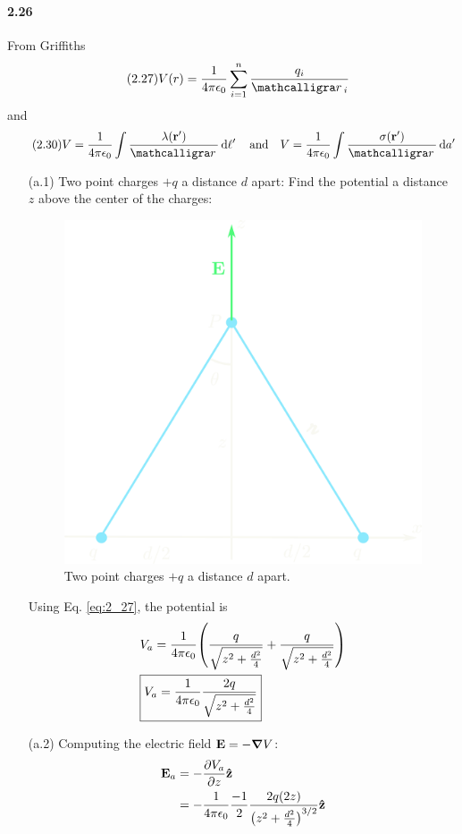 \documentclass[../main.tex]{subfiles}
\begin{document}
\newpage 
\paragraph{2.26} \label{prob:2_25}
From Griffiths %
\begin{align*} \tag{2.27} \label{eq:2_27}
    V(r) &= \ke \sum_{i = 1}^n \frac{q_i}{\scriptr_i}
\end{align*}
and
\begin{align*} \tag{2.30} \label{eq:2_30}
    V = \ke \int \frac{\lambda(\vb r')}{\scriptr} \dd{\ell'} \qand V = \ke \int \frac{\sigma(\vb r')}{\scriptr} \dd{a'} 
\end{align*}
\begin{enumerate}
    \item [(a.1)] Two point charges $+q$ a distance $d$ apart: Find the potential a distance $z$ above the center of the charges:
    \begin{figure}[ht]
        \centering
        \includegraphics[width=0.5\linewidth]{images/hw2_25a.png}
        \captionsetup{width=0.8\linewidth}
        \caption{Two point charges $+q$ a distance $d$ apart.}
        \label{fig:2_25a}
    \end{figure}
    Using Eq. \eqref{eq:2_27}, the potential is
    \begin{align*}
        &V_a = \ke \qt(\frac{q}{\sqrt{z^2 + \frac{d^2}{4}}} + \frac{q}{\sqrt{z^2 + \frac{d^2}{4}}}) \\
        &\boxed{V_a = \ke \frac{2q}{\sqrt{z^2 + \frac{d^2}{4}}}}
    \end{align*}
    \item [(a.2)] Computing the electric field $\vb E = -\grad V$:
    \begin{align*}
        \vb E_a &= -\pdv{V_a}{z} \vu z \\
        &= -\ke \frac{-1}{2} \frac{2q(2z)}{\qt(z^2 + \frac{d^2}{4})^{3/2}} \vu z
    \end{align*}

\end{enumerate}
\end{document}
